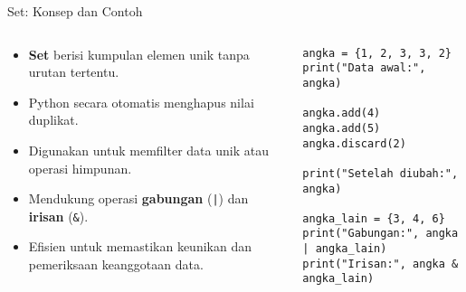 \documentclass[aspectratio=169, table]{beamer}
\begin{document}
\begin{frame}[fragile]{Set: Konsep dan Contoh}
\vspace{20pt}

\begin{columns}[T]
  \begin{column}{0.48\textwidth}
    \begin{itemize}
      \item \textbf{Set} berisi kumpulan elemen unik tanpa urutan tertentu.
      \item Python secara otomatis menghapus nilai duplikat.
      \item Digunakan untuk memfilter data unik atau operasi himpunan.
      \item Mendukung operasi \textbf{gabungan} (\texttt{|}) dan \textbf{irisan} (\texttt{\&}).
      \item Efisien untuk memastikan keunikan dan pemeriksaan keanggotaan data.
    \end{itemize}
  \end{column}

  \begin{column}{0.48\textwidth}
    \begin{lstlisting}[style=PythonStyle]
angka = {1, 2, 3, 3, 2}
print("Data awal:", angka)

angka.add(4)
angka.add(5)
angka.discard(2)

print("Setelah diubah:", angka)

angka_lain = {3, 4, 6}
print("Gabungan:", angka | angka_lain)
print("Irisan:", angka & angka_lain)
    \end{lstlisting}
  \end{column}
\end{columns}

\end{frame}
\end{document}
